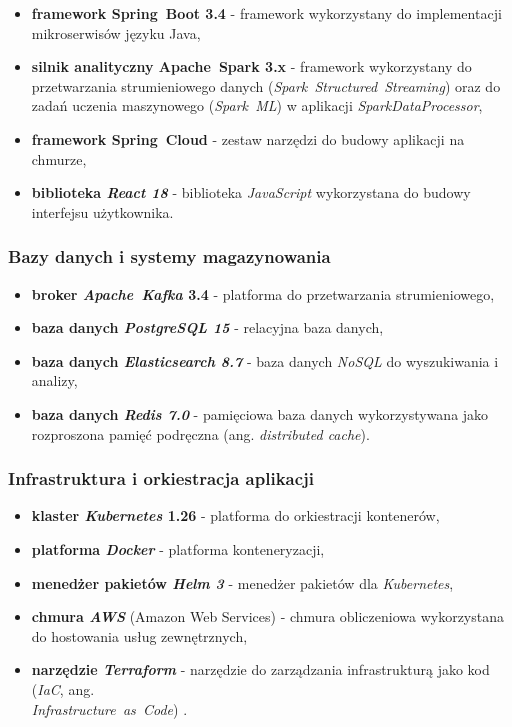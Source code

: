 \begin{itemize}
    \item \textbf{framework \mbox{Spring Boot} 3.4} - framework wykorzystany do implementacji mikroserwisów języku Java,
    \item \textbf{silnik analityczny \mbox{Apache Spark} 3.x} \cite{spark_streaming} - framework wykorzystany do przetwarzania strumieniowego danych (\mbox{\textit{Spark Structured Streaming}}) \cite{chambers2018spark} oraz do zadań uczenia maszynowego (\mbox{\textit{Spark ML}}) w aplikacji \textit{SparkDataProcessor},
    \item \textbf{framework \mbox{Spring Cloud}} - zestaw narzędzi do budowy aplikacji na chmurze,
    \item \textbf{biblioteka \textit{React 18}} - biblioteka \textit{JavaScript} wykorzystana do budowy interfejsu użytkownika.
\end{itemize}

\subsubsection{Bazy danych i systemy magazynowania}
\label{subsubsec:bazy_danych}

\begin{itemize}
    \item \textbf{broker \mbox{\textit{Apache Kafka}} 3.4} \cite{kafka} - platforma do przetwarzania strumieniowego,
    \item \textbf{baza danych \textit{PostgreSQL 15}} - relacyjna baza danych,
    \item \textbf{baza danych \textit{Elasticsearch 8.7}} - baza danych \mbox{\textit{NoSQL}} \cite{nosql_definition} do wyszukiwania i analizy,
    \item \textbf{baza danych \textit{Redis 7.0}} - pamięciowa baza danych wykorzystywana jako rozproszona pamięć podręczna (ang. \textit{distributed cache}).
\end{itemize}

\subsubsection{Infrastruktura i orkiestracja aplikacji}
\label{subsubsec:infrastruktura}

\begin{itemize}
    \item \textbf{klaster \textit{Kubernetes} 1.26} \cite{kubernetes} - platforma do orkiestracji kontenerów,
    \item \textbf{platforma \textit{Docker}} - platforma konteneryzacji,
    \item \textbf{menedżer pakietów \textit{Helm 3}} - menedżer pakietów dla \textit{Kubernetes},
    \item \textbf{chmura \textit{AWS}} (Amazon Web Services) \cite{aws_definition} - chmura obliczeniowa wykorzystana do hostowania usług zewnętrznych,
    \item \textbf{narzędzie \textit{Terraform}} - narzędzie do zarządzania infrastrukturą jako kod (\textit{IaC}, ang. \\ \textit{\mbox{Infrastructure as Code}}) \cite{terraform_docs}.
\end{itemize}

